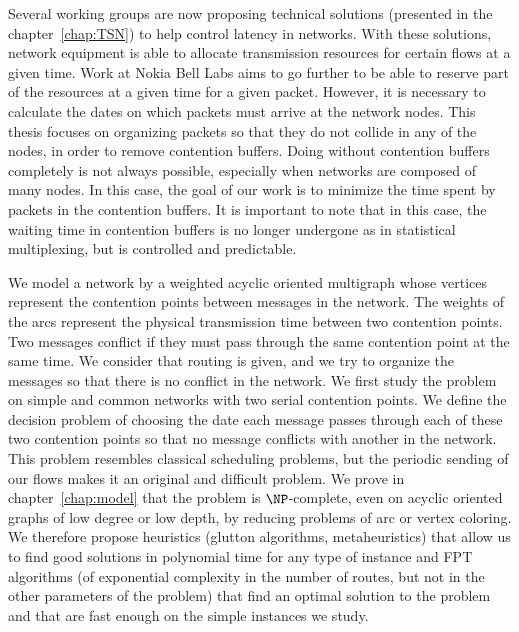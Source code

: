 Several working groups are now proposing technical solutions (presented in the chapter~\ref{chap:TSN}) to help control latency in networks. With these solutions, network equipment is able to allocate transmission resources for certain flows at a given time. Work at Nokia Bell Labs aims to go further to be able to reserve part of the resources at a given time for a given packet. However, it is necessary to calculate the dates on which packets must arrive at the network nodes. This thesis focuses on organizing packets so that they do not collide in any of the nodes, in order to remove contention buffers. Doing without contention buffers completely is not always possible, especially when networks are composed of many nodes. In this case, the goal of our work is to minimize the time spent by packets in the contention buffers. It is important to note that in this case, the waiting time in contention buffers is no longer undergone as in statistical multiplexing, but is controlled and predictable.

We model a network by a weighted acyclic oriented multigraph whose vertices represent the contention points between messages in the network. The weights of the arcs represent the physical transmission time between two contention points. Two messages conflict if they must pass through the same contention point at the same time. We consider that routing is given, and we try to organize the messages so that there is no conflict in the network. We first study the problem on simple and common networks with two serial contention points. 
We define the decision problem of choosing the date each message passes through each of these two contention points so that no message conflicts with another in the network. This problem resembles classical scheduling problems, but the periodic sending of our flows makes it an original and difficult problem. We prove in chapter~\ref{chap:model} that the problem is $\NP$-complete, even on acyclic oriented graphs of low degree or low depth, by reducing problems of arc or vertex coloring. We therefore propose heuristics (glutton algorithms, metaheuristics) that allow us to find good solutions in polynomial time for any type of instance and FPT algorithms (of exponential complexity in the number of routes, but not in the other parameters of the problem) that find an optimal solution to the problem and that are fast enough on the simple instances we study.



